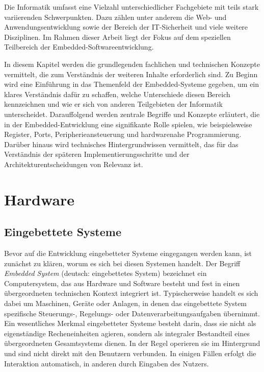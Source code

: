 
Die Informatik umfasst eine Vielzahl unterschiedlicher Fachgebiete mit teils stark variierenden Schwerpunkten. 
Dazu zählen unter anderem die Web- und Anwendungsentwicklung sowie der Bereich der IT-Sicherheit und viele weitere Disziplinen. 
Im Rahmen dieser Arbeit liegt der Fokus auf dem speziellen Teilbereich der Embedded-Softwareentwicklung.

In diesem Kapitel werden die grundlegenden fachlichen und technischen Konzepte vermittelt, die zum Verständnis der weiteren Inhalte erforderlich sind.
Zu Beginn wird eine Einführung in das Themenfeld der Embedded-Systeme gegeben, um ein klares Verständnis dafür zu schaffen, welche Unterschiede diesen Bereich kennzeichnen und wie er sich von anderen Teilgebieten der Informatik unterscheidet.
Darauffolgend werden zentrale Begriffe und Konzepte erläutert, die in der Embedded-Entwicklung eine signifikante Rolle spielen, wie beispielsweise Register, Ports, Peripherieansteuerung und hardwarenahe Programmierung.
Darüber hinaus wird technisches Hintergrundwissen vermittelt, das für das Verständnis der späteren Implementierungsschritte und der Architekturentscheidungen von Relevanz ist.

\section{Hardware}
\subsection{Eingebettete Systeme}
Bevor auf die Entwicklung eingebetteter Systeme eingegangen werden kann, ist zunächst zu klären, worum es sich bei diesen Systemen handelt.
Der Begriff \emph{Embedded System} (deutsch: eingebettetes System) bezeichnet ein Computersystem, das aus Hardware und Software besteht und fest in einen übergeordneten technischen Kontext integriert ist. 
Typischerweise handelt es sich dabei um Maschinen, Geräte oder Anlagen, in denen das eingebettete System spezifische Steuerungs-, Regelungs- oder Datenverarbeitungsaufgaben übernimmt.
Ein wesentliches Merkmal eingebetteter Systeme besteht darin, dass sie nicht als eigenständige Recheneinheiten agieren, sondern als integraler Bestandteil eines übergeordneten Gesamtsystems dienen.
In der Regel operieren sie im Hintergrund und sind nicht direkt mit den Benutzern verbunden. In einigen Fällen erfolgt die Interaktion automatisch, in anderen durch Eingaben des Nutzers.

